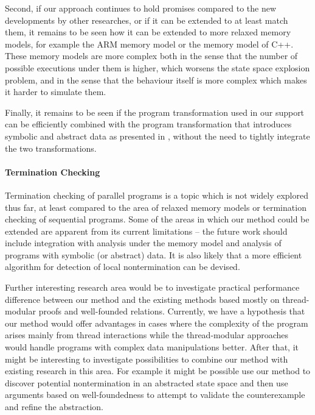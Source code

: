 Second, if our approach continues to hold promises compared to the new developments by other researches, or if it can be extended to at least match them, it remains to be seen how it can be extended to more relaxed memory models, for example the ARM memory model or the memory model of C++.
These memory models are more complex both in the sense that the number of possible executions under them is higher, which worsens the state space explosion problem, and in the sense that the behaviour itself is more complex which makes it harder to simulate them.

Finally, it remains to be seen if the program transformation used in our \xtso support can be efficiently combined with the program transformation that introduces symbolic and abstract data as presented in , without the need to tightly integrate the two transformations.

\paragraph{Termination Checking}

Termination checking of parallel programs is a topic which is not widely explored thus far, at least compared to the area of relaxed memory models or termination checking of sequential programs.
Some of the areas in which our method could be extended are apparent from its current limitations -- the future work should include integration with analysis under the \xtso memory model and analysis of programs with symbolic (or abstract) data.
It is also likely that a more efficient algorithm for detection of local nontermination can be devised.

Further interesting research area would be to investigate practical performance difference between our method and the existing methods based mostly on thread-modular proofs and well-founded relations.
Currently, we have a hypothesis that our method would offer advantages in cases where the complexity of the program arises mainly from thread interactions while the thread-modular approaches would handle programs with complex data manipulations better.
After that, it might be interesting to investigate possibilities to combine our method with existing research in this area.
For example it might be possible use our method to discover potential nontermination in an abstracted state space and then use arguments based on well-foundedness to attempt to validate the counterexample and refine the abstraction.

